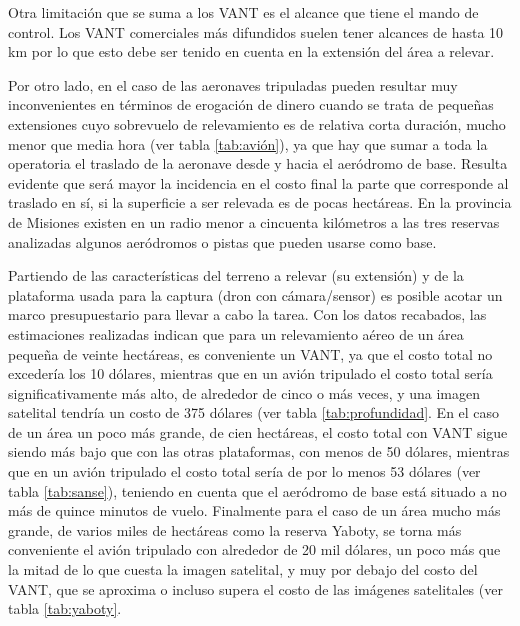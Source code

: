 Otra limitación que se suma a los VANT es el alcance que tiene el mando de control. Los VANT comerciales más difundidos suelen tener alcances de hasta 10 km \cite{noauthor_dji_nodate} por lo que esto debe ser tenido en cuenta en la extensión del área a relevar.

Por otro lado, en el caso de las aeronaves tripuladas pueden resultar muy inconvenientes en términos de erogación de dinero cuando se trata de pequeñas extensiones cuyo sobrevuelo de relevamiento es de relativa corta duración, mucho menor que media hora (ver tabla \ref{tab:avión}), ya que hay que sumar a toda la operatoria el traslado de la aeronave desde y hacia el aeródromo de base. Resulta evidente que será mayor la incidencia en el costo final la parte que corresponde al traslado en sí, si la superficie a ser relevada es de pocas hectáreas. En la provincia de Misiones existen en un radio menor a cincuenta kilómetros a las tres reservas analizadas algunos aeródromos o pistas que pueden usarse como base.


Partiendo de las características del terreno a relevar (su extensión) y de la plataforma usada para la captura (dron con cámara/sensor) es posible acotar un marco presupuestario para llevar a cabo la tarea. Con los datos recabados, las estimaciones realizadas indican que para un relevamiento aéreo de un área pequeña de veinte hectáreas, es conveniente un VANT, ya que el costo total no excedería los 10 dólares, mientras que en un avión tripulado el costo total sería significativamente más alto, de alrededor de cinco o más veces, y una imagen satelital tendría un costo de 375 dólares (ver tabla \ref{tab:profundidad}. En el caso de un área un poco más grande, de cien hectáreas, el costo total con VANT sigue siendo más bajo que con las otras plataformas, con menos de 50 dólares, mientras que en un avión tripulado el costo total sería de por lo menos 53 dólares (ver tabla \ref{tab:sanse}), teniendo en cuenta que el aeródromo de base está situado a no más de quince minutos de vuelo. Finalmente para el caso de un área mucho más grande, de varios miles de hectáreas como la reserva Yaboty, se torna más conveniente el avión tripulado con alrededor de 20 mil dólares, un poco más que la mitad de lo que cuesta la imagen satelital, y muy por debajo del costo del VANT, que se aproxima o incluso supera el costo de las imágenes satelitales (ver tabla \ref{tab:yaboty}.


